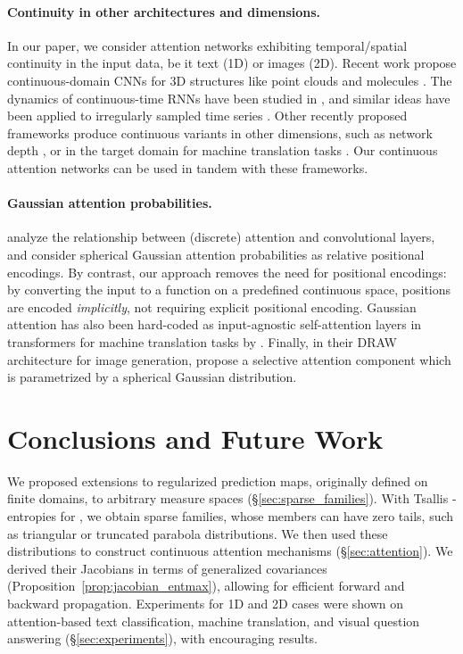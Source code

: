 \documentclass{article}
\newcommand{\remove}[1]{}
\begin{document}
\paragraph{Continuity in other architectures and dimensions.} 
In our paper, we consider attention networks exhibiting temporal/spatial continuity in the input data, be it text (1D) or images (2D). Recent work propose continuous-domain CNNs for 3D structures like point clouds and molecules \citep{wang2018deep,schutt2017schnet}. The dynamics of continuous-time RNNs have been studied in \citep{funahashi1993approximation}, and similar ideas have been applied to irregularly sampled time series \citep{rubanova2019latent}. 
Other recently proposed frameworks produce continuous variants in other dimensions, such as network depth \citep{chen2018neural}, or in the target domain for machine translation tasks \citep{kumar2018mises}.
Our continuous attention networks can be used in tandem with these frameworks.

\paragraph{Gaussian attention probabilities.} 
\citet{cordonnier2020relationship} analyze the relationship between (discrete) attention and convolutional layers, and consider spherical Gaussian attention probabilities as relative positional encodings. By contrast, our approach removes the need for positional encodings: by converting the input to a function on a predefined continuous space, positions are encoded {\it implicitly}, not requiring explicit positional encoding. 
Gaussian attention has also been hard-coded as input-agnostic self-attention layers in transformers for machine translation tasks by 
\citet{you-etal-2020-hard}. 
Finally, in their DRAW architecture for image generation, \citet[\S 3.1]{gregor2015draw} propose a selective attention component which is parametrized by a spherical Gaussian distribution. 


 

\section{Conclusions and Future Work}

We proposed extensions to regularized prediction maps,\remove{and FY losses,} originally defined on finite domains, to arbitrary measure spaces (\S\ref{sec:sparse_families}). 
With Tsallis -entropies for , we obtain sparse families, whose members can have zero tails, such as triangular or truncated parabola distributions. 
We then used these distributions to construct continuous attention mechanisms (\S\ref{sec:attention}). We derived their Jacobians in terms of generalized covariances (Proposition~\ref{prop:jacobian_entmax}), allowing for efficient forward and backward propagation.  Experiments for 1D and 2D cases were shown on attention-based text classification, machine translation, and visual question answering (\S\ref{sec:experiments}), with encouraging results. \remove{and FY-based interval regression.}
\end{document}
